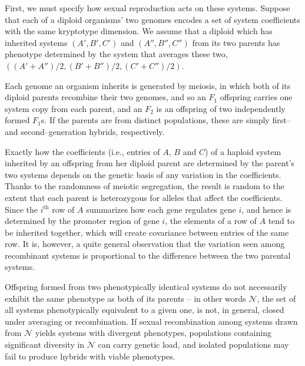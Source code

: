 \documentclass{article}
\newcommand{\1}{\mathbbm{1}}
\newcommand{\allS}{\mathcal{N}}
\begin{document}
First, we must specify how sexual reproduction acts on these systems.
Suppose that each of a diploid organisms' two genomes encodes a set of system coefficients
with the same kryptotype dimension. 
We assume that a diploid which has inherited systems $(A', B', C')$ and $(A'', B'', C'')$ from its two parents
has phenotype determined by the system that averages these two,
$((A'+A'')/2, (B'+B'')/2, (C'+C'')/2)$.

Each genome an organism inherits is generated by meiosis,
in which both of its diploid parents recombine their two genomes,
and so an $F_1$ offspring carries one system copy from each parent,
and an $F_2$ is an offspring of two independently formed $F_1$s.
If the parents are from distinct populations,
these are simply first-- and second--generation hybrids, respectively.

Exactly how the coefficients 
(i.e., entries of $A$, $B$ and $C$)
of a haploid system inherited by an offspring from her diploid parent
are determined by the parent's two systems
depends on the genetic basis of any variation in the coefficients.
Thanks to the randomness of meiotic segregation,
the result is random to the extent that each parent is heterozygous
for alleles that affect the coefficients.
Since the $i^\text{th}$ row of $A$ summarizes how each gene regulates gene $i$,
and hence is determined by the promoter region of gene $i$,
the elements of a row of $A$ tend to be inherited together,
which will create covariance between entries of the same row.
It is, however, a quite general observation that the variation seen among recombinant systems
is proportional to the difference between the two parental systems.

Offspring formed from two phenotypically identical systems do not necessarily exhibit the same phenotype as both of its parents 
-- in other words $\allS$, the set of all systems phenotypically equivalent to a given one, is not, in general, closed under averaging or recombination.
If sexual recombination among systems drawn from $\allS$ yields systems with divergent phenotypes, 
populations containing significant diversity in $\allS$ can carry genetic load, and isolated populations may fail to produce hybrids with viable phenotypes.
\end{document}
